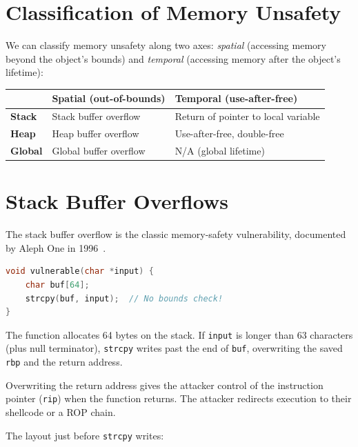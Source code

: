 \section{Classification of Memory Unsafety}

We can classify memory unsafety along two axes: \emph{spatial} (accessing memory beyond the object's bounds) and \emph{temporal} (accessing memory after the object's lifetime):

\begin{longtable}{p{3cm}p{5cm}p{5cm}}
	\toprule
	                & \textbf{Spatial} (out-of-bounds) & \textbf{Temporal} (use-after-free)  \\
	\midrule
	\textbf{Stack}  & Stack buffer overflow            & Return of pointer to local variable \\
	\textbf{Heap}   & Heap buffer overflow             & Use-after-free, double-free         \\
	\textbf{Global} & Global buffer overflow           & N/A (global lifetime)               \\
	\bottomrule
\end{longtable}

\section{Stack Buffer Overflows}

The stack buffer overflow is the classic memory-safety vulnerability, documented by Aleph One in 1996~\cite{aleph1996smashing}.

\begin{lstlisting}[language=C, caption=Vulnerable stack buffer]
void vulnerable(char *input) {
    char buf[64];
    strcpy(buf, input);  // No bounds check!
}
\end{lstlisting}

The function allocates 64 bytes on the stack. If \texttt{input} is longer than 63 characters (plus null terminator), \texttt{strcpy} writes past the end of \texttt{buf}, overwriting the saved \texttt{rbp} and the return address.

\begin{principle}
	Overwriting the return address gives the attacker control of the instruction pointer (\texttt{rip}) when the function returns. The attacker redirects execution to their shellcode or a ROP chain.
\end{principle}

The layout just before \texttt{strcpy} writes:


